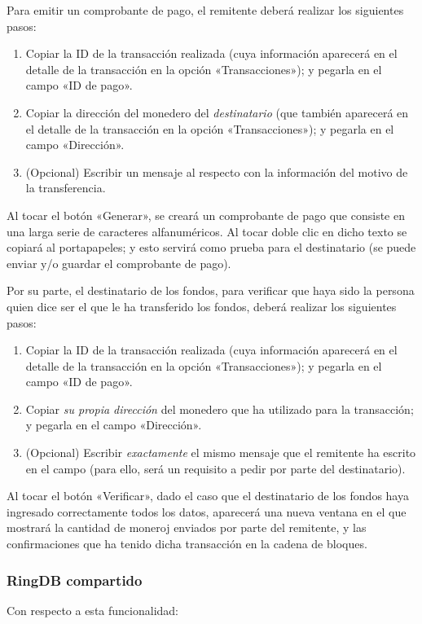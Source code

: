 \documentclass[12pt,a4paper,twoside]{book}
\begin{document}
Para emitir un comprobante de pago, el remitente deberá realizar los siguientes pasos:

\begin{enumerate}
\item Copiar la ID de la transacción realizada (cuya información aparecerá en el detalle de la transacción en la opción «Transacciones»); y pegarla en el campo «ID de pago».
\item Copiar la dirección del monedero del \textit{destinatario} (que también aparecerá en el detalle de la transacción en la opción «Transacciones»); y pegarla en el campo «Dirección».
\item (Opcional) Escribir un mensaje al respecto con la información del motivo de la transferencia.
\end{enumerate}

Al tocar el botón «Generar», se creará un comprobante de pago que consiste en una larga serie de caracteres alfanuméricos. Al tocar doble clic en dicho texto se copiará al portapapeles; y esto servirá como prueba para el destinatario (se puede enviar y/o guardar el comprobante de pago).

Por su parte, el destinatario de los fondos, para verificar que haya sido la persona quien dice ser el que le ha transferido los fondos, deberá realizar los siguientes pasos:

\begin{enumerate}
\item Copiar la ID de la transacción realizada (cuya información aparecerá en el detalle de la transacción en la opción «Transacciones»); y pegarla en el campo «ID de pago».
\item Copiar \textit{su propia dirección} del monedero que ha utilizado para la transacción; y pegarla en el campo «Dirección».
\item (Opcional) Escribir \textit{exactamente} el mismo mensaje que el remitente ha escrito en el campo (para ello, será un requisito a pedir por parte del destinatario).
\end{enumerate}

Al tocar el botón «Verificar», dado el caso que el destinatario de los fondos haya ingresado correctamente todos los datos, aparecerá una nueva ventana en el que mostrará la cantidad de moneroj enviados por parte del remitente, y las confirmaciones que ha tenido dicha transacción en la cadena de bloques.

\subsubsection{RingDB compartido}
Con respecto a esta funcionalidad:
\end{document}
